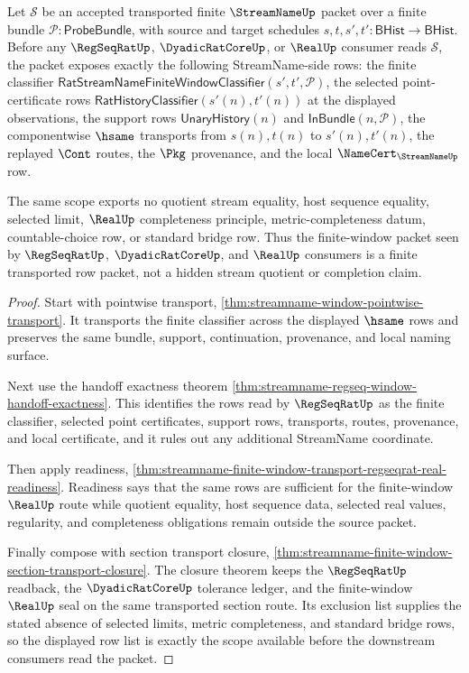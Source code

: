\begin{theorem}
\label{thm:streamname-pointwise-transport-scope}
Let $\mathcal{S}$ be an accepted transported finite $\StreamNameUp$ packet
over a finite bundle $\mathcal{P}:\mathsf{ProbeBundle}$, with source and
target schedules $s,t,s',t':\mathsf{BHist}\to\mathsf{BHist}$. Before any
$\RegSeqRatUp$, $\DyadicRatCoreUp$, or $\RealUp$ consumer reads
$\mathcal{S}$, the packet exposes exactly the following StreamName-side
rows: the finite classifier
$\mathsf{RatStreamNameFiniteWindowClassifier}(s',t',\mathcal{P})$, the
selected point-certificate rows
$\mathsf{RatHistoryClassifier}(s'(n),t'(n))$ at the displayed observations,
the support rows $\mathsf{UnaryHistory}(n)$ and
$\mathsf{InBundle}(n,\mathcal{P})$, the componentwise $\hsame$ transports
from $s(n),t(n)$ to $s'(n),t'(n)$, the replayed $\Cont$ routes, the $\Pkg$
provenance, and the local $\NameCert_{\StreamNameUp}$ row.

The same scope exports no quotient stream equality, host sequence equality,
selected limit, $\RealUp$ completeness principle, metric-completeness datum,
countable-choice row, or standard bridge row. Thus the finite-window packet
seen by $\RegSeqRatUp$, $\DyadicRatCoreUp$, and $\RealUp$ consumers is a
finite transported row packet, not a hidden stream quotient or completion
claim.
\end{theorem}
\begin{proof}
Start with pointwise transport,
\autoref{thm:streamname-window-pointwise-transport}. It transports the
finite classifier across the displayed $\hsame$ rows and preserves the same
bundle, support, continuation, provenance, and local naming surface.

Next use the handoff exactness theorem
\autoref{thm:streamname-regseq-window-handoff-exactness}. This identifies
the rows read by $\RegSeqRatUp$ as the finite classifier, selected point
certificates, support rows, transports, routes, provenance, and local
certificate, and it rules out any additional StreamName coordinate.

Then apply readiness,
\autoref{thm:streamname-finite-window-transport-regseqrat-real-readiness}.
Readiness says that the same rows are sufficient for the finite-window
$\RealUp$ route while quotient equality, host sequence data, selected real
values, regularity, and completeness obligations remain outside the source
packet.

Finally compose with section transport closure,
\autoref{thm:streamname-finite-window-section-transport-closure}. The
closure theorem keeps the $\RegSeqRatUp$ readback, the
$\DyadicRatCoreUp$ tolerance ledger, and the finite-window $\RealUp$ seal on
the same transported section route. Its exclusion list supplies the stated
absence of selected limits, metric completeness, and standard bridge rows,
so the displayed row list is exactly the scope available before the
downstream consumers read the packet.
\end{proof}

